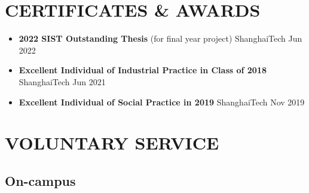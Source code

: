 \documentclass[a4paper,10pt]{ctexart} %
\begin{document}
\newpage



\section{CERTIFICATES \& AWARDS}

    \begin{itemize}
        \item \textbf{2022 SIST Outstanding Thesis} {\small (for final year project)} \hfill ShanghaiTech \quad Jun 2022
        \item \textbf{Excellent Individual of Industrial Practice in Class of 2018} \hfill ShanghaiTech \quad Jun 2021
        \item \textbf{Excellent Individual of Social Practice in 2019} \hfill ShanghaiTech \quad Nov 2019
    \end{itemize}



\section{VOLUNTARY SERVICE}

    \subsection{On-campus}
\end{document}
